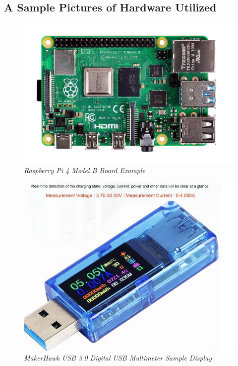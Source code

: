 \documentclass[conference]{IEEEtran}
\begin{document}
\FloatBarrier

\subsection{A Sample Pictures of Hardware Utilized}
\begin{figure}[htbp]
	\centerline{\includegraphics[scale=0.3]{fig5.png}}
	\caption{\textit{Raspberry Pi 4 Model B Board Example}}
	\label{fig5}
\end{figure}

\begin{figure}[htbp]
	\centerline{\includegraphics[scale=0.3]{fig6.png}}
	\caption{\textit{MakerHawk USB 3.0 Digital USB Multimeter Sample Display}}
	\label{fig6}
\end{figure}
\end{document}
